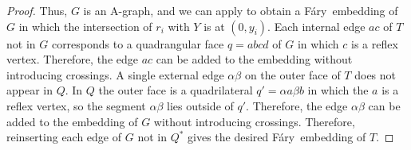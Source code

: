 \documentclass{patmorin}
\newcommand{\Fary}{Fáry}
\begin{document}
\begin{proof}
   Thus, $G$ is an A-graph, and we can apply  to
   obtain a \Fary\ embedding of $G$ in which the intersection of $r_i$
   with $Y$ is at $(0,y_i)$.  Each internal edge $ac$ of $T$ not in $G$
   corresponds to a quadrangular face $q=abcd$ of $G$ in which $c$ is a
   reflex vertex.  Therefore, the edge $ac$ can be added to the embedding
   without introducing crossings.  A single external edge $\alpha\beta$
   on the outer face of $T$ does not appear in $Q$.  In $Q$ the outer
   face is a quadrilateral $q'=\alpha a \beta b$ in which the $a$ is
   a reflex vertex, so the segment $\alpha\beta$ lies outside of $q'$.
   Therefore, the edge $\alpha\beta$ can be added to the embedding of $G$
   without introducing crossings.
   Therefore, reinserting each edge of $G$ not in $Q^*$ gives the desired
   \Fary\ embedding of $T$.


\end{proof}
\end{document}

